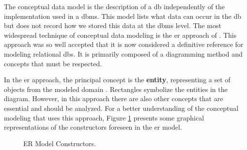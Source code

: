 The conceptual data model is the description of a \ac{db} independently of the implementation used in a \ac{dbms}.
This model lists what data can occur in the \ac{db} but does not record how we stored this data at the \ac{dbms} level.
The most widespread technique of conceptual data modeling is the \ac{er} approach of \cite{Chen:1976}.
This approach was so well accepted that it is now considered a definitive reference for modeling relational \acp{db}.
It is primarily composed of a diagramming method and concepts that must be respected.

In the \ac{er} approach, the principal concept is the \textbf{entity}, representing a set of objects from the modeled domain \cite{Heuser:2009}. 
Rectangles symbolize the entities in the diagram. 
However, in this approach there are also other concepts that are essential and should be analyzed. 
For a better understanding of the conceptual modeling that uses this approach, Figure \ref{fig:ERConstructors} presents some graphical representations of the constructors foreseen in the \ac{er} model.

\begin{figure} [!htb]
    \centering
    \caption{ER Model Constructors.}
    \label{fig:ERConstructors}
    
\end{figure}

